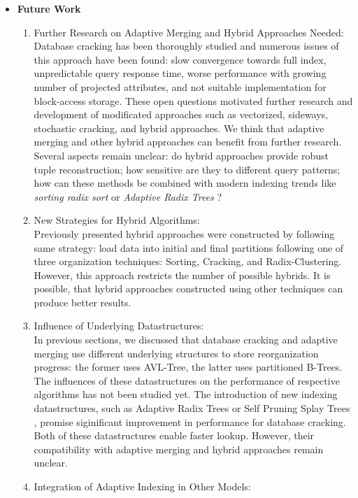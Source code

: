 \documentclass[10pt, conference, compsocconf]{IEEEtran}
\begin{document}
\begin{itemize}
\begin{enumerate}
\end{enumerate}
\item{\textbf{Future Work}}
\begin{enumerate}
\item{Further Research on Adaptive Merging and Hybrid Approaches Needed:}\\
Database cracking has been thoroughly studied and numerous issues of this approach have been found: slow convergence towards full index, unpredictable query response time, worse performance with growing number of projected attributes, and not suitable implementation for block-access storage. These open questions motivated further research and development of modificated approaches such as vectorized, sideways, stochastic cracking, and hybrid approaches. We think that adaptive merging and other hybrid approaches can benefit from further research. Several aspects remain unclear: do hybrid approaches provide robust tuple reconstruction; how sensitive are they to different query patterns; how can these methods be combined with modern indexing trends like \emph{sorting radix sort} or \emph{Adaptive Radix Trees} \cite{art}? \\
\item{New Strategies for Hybrid Algorithms:}\\
Previously presented hybrid approaches were constructed by following same strategy: load data into initial and final partitions following one of three organization techniques: Sorting, Cracking, and Radix-Clustering. However, this approach restricts the number of possible hybrids. It is possible, that hybrid approaches constructed using other techniques can produce better results.\\
\item{Influence of Underlying Datastructures:}\\
In previous sections, we discussed that database cracking and adaptive merging use different underlying structures to store reorganization progress: the former uses AVL-Tree, the latter uses partitioned B-Trees. The influences of these datastructures on the performance of respective algorithms has not been studied yet. The introduction of new indexing datastructures, such as Adaptive Radix Trees or Self Pruning Splay Trees \cite{spst}, promise siginificant improvement in performance for database cracking. Both of these datastructures enable faster lookup. However, their compatibility with adaptive merging and hybrid approaches remain unclear.\\
\item{Integration of Adaptive Indexing in Other Models:}\\

\end{enumerate}
\end{itemize}
\end{document}
